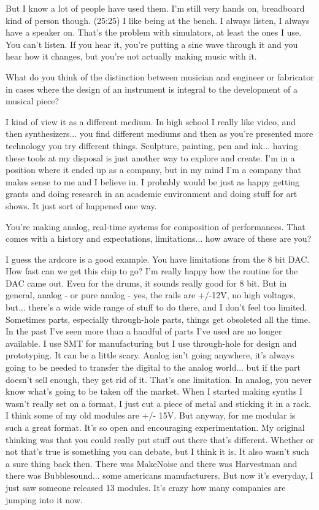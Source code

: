 But I know a lot of people have used them. I'm still very hands on, breadboard kind of person though. (25:25) I like being at the bench. I always listen, I always have a speaker on. That's the problem with simulators, at least the ones I use. You can't listen. If you hear it, you're putting a sine wave through it and you hear how it changes, but you're not actually making music with it. 

What do you think of the distinction between musician and engineer or fabricator in cases where the design of an instrument is integral to the development of a musical piece? 

I kind of view it as a different medium. In high school I really like video, and then synthesizers... you find different mediums and then as you're presented more technology you try different things. Sculpture, painting, pen and ink... having these tools at my disposal is just another way to explore and create. I'm in a position where it ended up as a company, but in my mind I'm a company that makes sense to me and I believe in. I probably would be just as happy getting grants and doing research in an academic environment and doing stuff for art shows. It just sort of happened one way. 

You're making analog, real-time systems for composition of performances. That comes with a history and expectations, limitations... how aware of these are you? 

I guess the ardcore is a good example. You have limitations from the 8 bit DAC. How fast can we get this chip to go? I'm really happy how the routine for the DAC came out. Even for the drums, it sounds really good for 8 bit. But in general, analog - or pure analog - yes, the rails are +/-12V, no high voltages, but... there's a wide wide range of stuff to do there, and I don't feel too limited. Sometimes parts, especially through-hole parts, things get obsoleted all the time. In the past I've seen more than a handful of parts I've used are no longer available. I use SMT for manufacturing but I use through-hole for design and prototyping. It can be a little scary. Analog isn't going anywhere, it's always going to be needed to transfer the digital to the analog world... but if the part doesn't sell enough, they get rid of it. That's one limitation. In analog, you never know what's going to be taken off the market. When I started making synths I wasn't really set on a format, I just cut a piece of metal and sticking it in a rack. I think some of my old modules are +/- 15V. But anyway, for me modular is such a great format. It's so open and encouraging experimentation. My original thinking was that you could really put stuff out there that's different. Whether or not that's true is something you can debate, but I think it is. It also wasn't such a sure thing back then. There was MakeNoise and there was Harvestman and there was Bubblesound... some americans manufacturers. But now it's everyday, I just saw someone released 13 modules. It's crazy how many companies are jumping into it now. 

